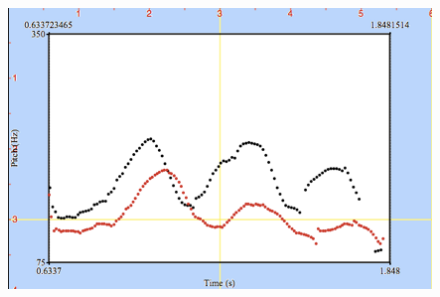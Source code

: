 \begin{figure}
  \includegraphics[width=\linewidth]{figures/fig-ch4-5.png}
\caption{}
  \label{fig:4-5}
\end{figure}

